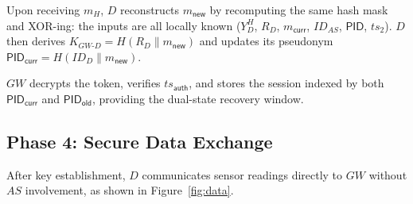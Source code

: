 \documentclass[conference]{IEEEtran}
\begin{document}
Upon receiving $m_H$, $D$ reconstructs $m_\mathsf{new}$ by recomputing the
same hash mask and XOR-ing: the inputs are all locally known ($Y_D^H$, $R_D$,
$m_\mathsf{curr}$, $ID_{AS}$, $\mathsf{PID}$, $ts_2$).  $D$ then derives
$K_{GW\text{-}D} = H(R_D \| m_\mathsf{new})$ and updates its pseudonym
$\mathsf{PID}_\mathsf{curr} = H(ID_D \| m_\mathsf{new})$.

$GW$ decrypts the token, verifies $ts_\mathsf{auth}$, and stores the session
indexed by both $\mathsf{PID}_\mathsf{curr}$ and $\mathsf{PID}_\mathsf{old}$,
providing the dual-state recovery window.

\subsection{Phase 4: Secure Data Exchange}

After key establishment, $D$ communicates sensor readings directly to $GW$
without $AS$ involvement, as shown in Figure~\ref{fig:data}.
\end{document}
